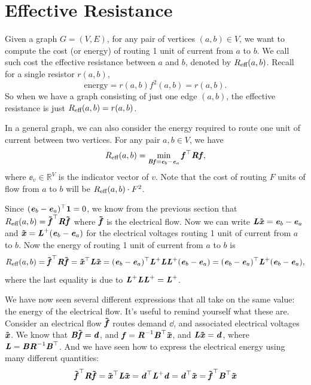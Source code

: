 \section{Effective Resistance}
Given a graph $G=(V,E)$, for any pair of vertices $(a,b)\in V$, we
want to compute the cost (or energy) of routing 1 unit of current
from $a$ to $b$. We call such cost the effective resistance between
$a$ and $b$, denoted by $\er(a,b)$. Recall for a single resistor
$r(a,b)$,
\[
  \text{energy} =r(a,b)f^2(a,b)=r(a,b)
  .
\]
So when we have a graph consisting of just one edge
$(a,b)$, the effective resistance is just $\er(a,b)=r(a,b)$.

In a general graph, we can also consider the energy required to route
one unit of current between two vertices.
For any pair $a,b\in V$, we have
\[ \er(a,b) = \min_{\BB\ff=\ee_b-\ee_a} \ff^\trp\RR\ff, \]
where $\ee_v \in \mathbb{R}^V$ is the indicator vector of $v$.
Note that the cost of routing $F$ units of flow from $a$ to $b$ will be $\er(a,b)\cdot F^2$.

Since $(\ee_b-\ee_a)^\trp\matone=0$, we know from the previous section
that $\er(a,b) = \fftil^\trp\RR\fftil$ where $\fftil$ is the
electrical flow.
Now we can write
$\LL\xxtil=\ee_b-\ee_a$ and $\xxtil=\LL^{\pinv}(\ee_b-\ee_a)$ for the
electrical voltages routing 1 unit of current from $a$ to $b$.
Now the energy of routing 1 unit of current from $a$ to $b$ is
\[ \er(a,b) = \fftil^\trp\RR\fftil = \xxtil^\trp\LL\xxtil =  (\ee_b-\ee_a)^\trp\LL^{\pinv}\LL\LL^{\pinv}(\ee_b-\ee_a) = (\ee_b-\ee_a)^\trp\LL^{\pinv}(\ee_b-\ee_a), \]
where the last equality is due to
$\LL^{\pinv}\LL\LL^{\pinv}=\LL^{\pinv}$.

\begin{remark}
  We have now seen several different expressions that all take on the
  same value: the energy of the electrical flow.
  It's useful to remind yourself what these are.
  Consider an electrical flow $\fftil$ routes demand $\dd$, and
  associated electrical voltages
  $\xxtil$.
  We know that $\BB \fftil = \dd$, and $\ff = \RR^{-1} \BB^{\trp}
  \xxtil$,
  and $\LL \xxtil = \dd$, where $\LL = \BB \RR^{-1} \BB^{\trp}$.
  And we have seen how to express the electrical energy using many
  different quantities:
  \[
     \fftil^\trp\RR\fftil  =  \xxtil^\trp\LL\xxtil = \dd^\trp \LL^{\pinv}
     \dd =\dd^\trp\xxtil = \fftil^{\trp}\BB^{\trp} \xxtil
   \]
\end{remark}

